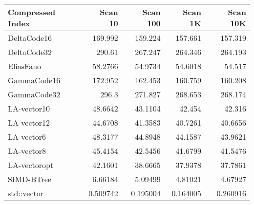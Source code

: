 \begin{tabular}{lrrrr}
\hline
 Compressed Index   &    Scan 10 &   Scan 100 &    Scan 1K &   Scan 10K \\
\hline
 DeltaCode16        & 169.992    & 159.224    & 157.661    & 157.319    \\
 DeltaCode32        & 290.61     & 267.247    & 264.346    & 264.193    \\
 EliasFano          &  58.2766   &  54.9734   &  54.6018   &  54.517    \\
 GammaCode16        & 172.952    & 162.453    & 160.759    & 160.208    \\
 GammaCode32        & 296.3      & 271.827    & 268.653    & 268.174    \\
 LA-vector10        &  48.6642   &  43.1104   &  42.454    &  42.316    \\
 LA-vector12        &  44.6708   &  41.3583   &  40.7261   &  40.6656   \\
 LA-vector6         &  48.3177   &  44.8948   &  44.1587   &  43.9621   \\
 LA-vector8         &  45.4154   &  42.5456   &  41.6799   &  41.5476   \\
 LA-vectoropt       &  42.1601   &  38.6665   &  37.9378   &  37.7861   \\
 SIMD-BTree         &   6.66184  &   5.09499  &   4.81021  &   4.67927  \\
 std::vector        &   0.509742 &   0.195004 &   0.164005 &   0.260916 \\
\hline
\end{tabular}